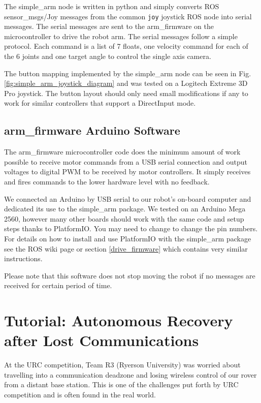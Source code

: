 \documentclass[runningheads,a4paper]{llncs}
\begin{document}
The simple\_arm node is written in python and simply converts ROS sensor\_msgs/Joy messages from the common \texttt{joy} joystick ROS node into serial messages. The serial messages are sent to the arm\_firmware on the microcontroller to drive the robot arm. The serial messages follow a simple protocol. Each command is a list of 7 floats, one velocity command for each of the 6 joints and one target angle to control the single axis camera.

The button mapping implemented by the simple\_arm node can be seen in Fig. \ref{fig:simple_arm_joystick_diagram} and was tested on a Logitech Extreme 3D Pro joystick. The button layout should only need small modifications if any to work for similar controllers that support a DirectInput mode.

\subsection{arm\_firmware Arduino Software}\label{arm_firmware}

The arm\_firmware microcontroller code does the minimum amount of work possible to receive motor commands from a USB serial connection and output voltages to digital PWM to be received by motor controllers. It simply receives and fires commands to the lower hardware level with no feedback.

We connected an Arduino by USB serial to our robot's on-board computer and dedicated its use to the simple\_arm package. We tested on an Arduino Mega 2560, however many other boards should work with the same code and setup steps thanks to PlatformIO. You may need to change to change the pin numbers. For details on how to install and use PlatformIO with the simple\_arm package see the ROS wiki page or section \ref{drive_firmware} which contains very similar instructions.

Please note that this software does not stop moving the robot if no messages are received for certain period of time. 

\section{Tutorial: Autonomous Recovery after Lost Communications}\label{lostcomms}
At the URC competition, Team R3 (Ryerson University) was worried about travelling into a communication deadzone and losing wireless control of our rover from a distant base station. This is one of the challenges put forth by URC competition and is often found in the real world.
\end{document}
